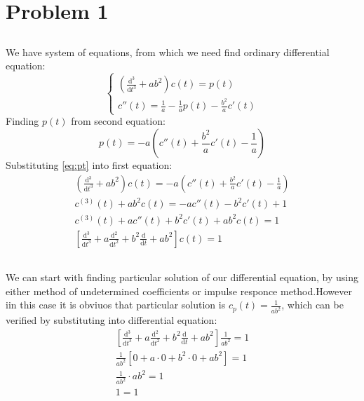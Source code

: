 \documentclass[12pt]{article}
\begin{document}
\renewcommand{\familydefault}{\rmdefault}




\section{Problem 1}
\subsection{}
We have system of equations, from which we need find ordinary differential equation:
\begin{equation}
    \begin{cases}
        \left(\frac{\mathrm{d}^3}{\mathrm{d}t^3}+ab^2\right)c(t) = p(t)\\
        c''(t) = \frac{1}{a}-\frac{1}{a}p(t)-\frac{b^2}{a}c'(t)
    \end{cases}
\end{equation}
Finding $p(t)$ from second equation:
\begin{equation}
    \label{eq:pt}
    p(t) = -a\left(c''(t)+\frac{b^2}{a}c'(t)-\frac{1}{a}\right)
\end{equation}
Substituting \eqref{eq:pt} into first equation:
\begin{equation}
    \begin{gathered}
        \left(\frac{\mathrm{d}^3}{\mathrm{d}t^3}+ab^2\right)c(t) = -a\left(c''(t)+\frac{b^2}{a}c'(t)-\frac{1}{a}\right)\\
        c^{(3)}(t)+ab^2c(t) = -ac''(t)-b^2c'(t)+1\\
        c^{(3)}(t)+ac''(t)+b^2c'(t)+ab^2c(t) = 1\\
        \left[\frac{\mathrm{d^3}}{\mathrm{d}t^3} + a\frac{\mathrm{d}^2}{\mathrm{d}t^2}+b^2 \frac{\mathrm{d}}{\mathrm{d}t}+ab^2\right]c(t)=1    
    \end{gathered}    
\end{equation}
\subsection{}
We can start with finding particular solution of our differential equation, by using either method of undetermined coefficients or impulse responce method.However iin this case it is obviuos that particular solution is $c_p(t) = \frac{1}{ab^2}$, which can be verified by substituting into differential equation:
\begin{equation}
    \begin{gathered}
        \left[\frac{\mathrm{d^3}}{\mathrm{d}t^3} + a\frac{\mathrm{d}^2}{\mathrm{d}t^2}+b^2 \frac{\mathrm{d}}{\mathrm{d}t}+ab^2\right]\frac{1}{ab^2}=1\\
        \frac{1}{ab^2}\left[0+a\cdot 0+b^2 \cdot 0+ab^2\right]=1\\
        \frac{1}{ab^2}\cdot ab^2=1\\
        1=1
    \end{gathered}
\end{equation}
\end{document}
